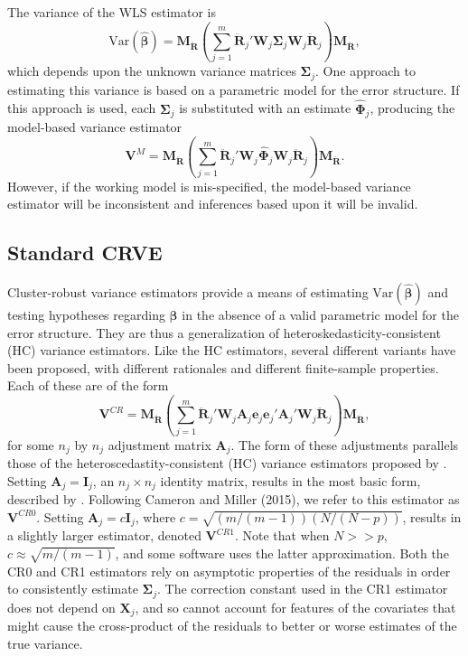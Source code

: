 \documentclass[12pt]{article}\usepackage[]{graphicx}\usepackage[]{color}
\newcommand{\Var}{\text{Var}}
\newcommand{\bm}{\mathbf}
\newcommand{\bs}{\boldsymbol}
\begin{document}
The variance of the WLS estimator is 
\begin{equation}
\label{eq:var_WLS}
\Var\left(\bs{\hat\beta}\right) = \bm{M_{\ddot{R}}}\left(\sum_{j=1}^m \bm{\ddot{R}}_j' \bm{W}_j \bs\Sigma_j \bm{W}_j\bm{\ddot{R}}_j\right) \bm{M_{\ddot{R}}},
\end{equation}
which depends upon the unknown variance matrices $\bm\Sigma_j$. 
One approach to estimating this variance is based on a parametric model for the error structure. 
If this approach is used, each $\bs\Sigma_j$ is substituted with an estimate $\bs{\hat\Phi}_j$, producing the model-based variance estimator
\begin{equation}
\label{eq:V_model}
\bm{V}^M = \bm{M_{\ddot{R}}}\left(\sum_{j=1}^m \bm{\ddot{R}}_j' \bm{W}_j \bs{\hat\Phi}_j \bm{W}_j\bm{\ddot{R}}_j\right) \bm{M_{\ddot{R}}}.
\end{equation}
However, if the working model is mis-specified, the model-based variance estimator will be inconsistent and inferences based upon it will be invalid.

\subsection{Standard CRVE}

Cluster-robust variance estimators provide a means of estimating $\Var\left(\bs{\hat\beta}\right)$ and testing hypotheses regarding $\bs\beta$ in the absence of a valid parametric model for the error structure. 
They are thus a generalization of heteroskedasticity-consistent (HC) variance estimators.
Like the HC estimators, several different variants have been proposed, with different rationales and different finite-sample properties. 
Each of these are of the form
\begin{equation}
\label{eq:V_small}
\bm{V}^{CR} = \bm{M_{\ddot{R}}}\left(\sum_{j=1}^m \bm{\ddot{R}}_j'\bm{W}_j \bm{A}_j \bm{e}_j \bm{e}_j' \bm{A}_j' \bm{W}_j \bm{\ddot{R}}_j\right) \bm{M_{\ddot{R}}},
\end{equation}
for some $n_j$ by $n_j$ adjustment matrix $\bm{A}_j$. 
The form of these adjustments parallels those of the heteroscedastity-consistent (HC) variance estimators proposed by \citet*{MacKinnon1985some}. 
Setting $\bm{A}_j = \bm{I}_j$, an $n_j \times n_j$ identity matrix, results in the most basic form, described by \citet{Liang1986longitudinal}. 
Following Cameron and Miller (2015), we refer to this estimator as $\bm{V}^{CR0}$. 
Setting $\bm{A}_j = c\bm{I}_j$, where $c = \sqrt{(m/(m-1))(N/(N - p))}$, results in a slightly larger estimator, denoted $\bm{V}^{CR1}$.
Note that when $N >> p$, $c \approx \sqrt{m/(m-1)}$, and some software uses the latter approximation.
Both the CR0 and CR1 estimators rely on asymptotic properties of the residuals in order to consistently estimate $\bs\Sigma_j$. 
The correction constant used in the CR1 estimator does not depend on $\bm{X}_j$, and so cannot account for features of the covariates that might cause the cross-product of the residuals to better or worse estimates of the true variance. 
\end{document}
